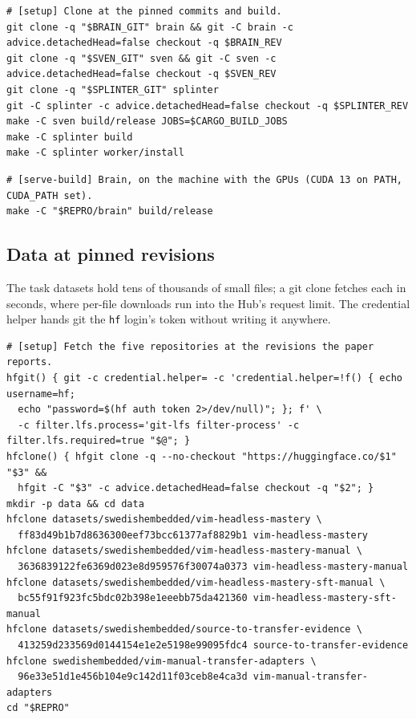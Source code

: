 {\scriptsize
\begin{verbatim}
# [setup] Clone at the pinned commits and build.
git clone -q "$BRAIN_GIT" brain && git -C brain -c advice.detachedHead=false checkout -q $BRAIN_REV
git clone -q "$SVEN_GIT" sven && git -C sven -c advice.detachedHead=false checkout -q $SVEN_REV
git clone -q "$SPLINTER_GIT" splinter
git -C splinter -c advice.detachedHead=false checkout -q $SPLINTER_REV
make -C sven build/release JOBS=$CARGO_BUILD_JOBS
make -C splinter build
make -C splinter worker/install
\end{verbatim}
}

{\scriptsize
\begin{verbatim}
# [serve-build] Brain, on the machine with the GPUs (CUDA 13 on PATH, CUDA_PATH set).
make -C "$REPRO/brain" build/release
\end{verbatim}
}

\subsection{Data at pinned revisions}\label{app:repro-vim-data}

\begin{sloppypar}
The task datasets hold tens of thousands of small files; a git clone fetches each in seconds, where per-file downloads run into
the Hub's request limit. The credential helper hands git the \texttt{hf} login's token without writing it anywhere.
\end{sloppypar}

{\scriptsize
\begin{verbatim}
# [setup] Fetch the five repositories at the revisions the paper reports.
hfgit() { git -c credential.helper= -c 'credential.helper=!f() { echo username=hf;
  echo "password=$(hf auth token 2>/dev/null)"; }; f' \
  -c filter.lfs.process='git-lfs filter-process' -c filter.lfs.required=true "$@"; }
hfclone() { hfgit clone -q --no-checkout "https://huggingface.co/$1" "$3" &&
  hfgit -C "$3" -c advice.detachedHead=false checkout -q "$2"; }
mkdir -p data && cd data
hfclone datasets/swedishembedded/vim-headless-mastery \
  ff83d49b1b7d8636300eef73bcc61377af8829b1 vim-headless-mastery
hfclone datasets/swedishembedded/vim-headless-mastery-manual \
  3636839122fe6369d023e8d959576f30074a0373 vim-headless-mastery-manual
hfclone datasets/swedishembedded/vim-headless-mastery-sft-manual \
  bc55f91f923fc5bdc02b398e1eeebb75da421360 vim-headless-mastery-sft-manual
hfclone datasets/swedishembedded/source-to-transfer-evidence \
  413259d233569d0144154e1e2e5198e99095fdc4 source-to-transfer-evidence
hfclone swedishembedded/vim-manual-transfer-adapters \
  96e33e51d1e456b104e9c142d11f03ceb8e4ca3d vim-manual-transfer-adapters
cd "$REPRO"
\end{verbatim}
}

